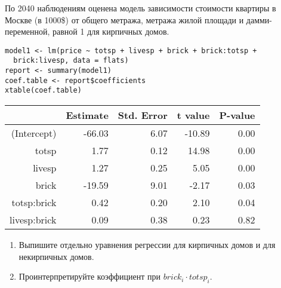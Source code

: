 \begin{problem}
По 2040 наблюдениям оценена модель зависимости стоимости квартиры в Москве (в 1000\$) от общего метража, метража жилой площади и дамми-переменной, равной 1 для кирпичных домов.
\begin{verbatim}
model1 <- lm(price ~ totsp + livesp + brick + brick:totsp +
  brick:livesp, data = flats)
report <- summary(model1)
coef.table <- report$coefficients
xtable(coef.table)
\end{verbatim}


\begin{tabular}{rrrrr}
  \hline
 & Estimate & Std. Error & t value & P-value \\
  \hline
(Intercept) & -66.03 & 6.07 & -10.89 & 0.00 \\
  totsp & 1.77 & 0.12 & 14.98 & 0.00 \\
  livesp & 1.27 & 0.25 & 5.05 & 0.00 \\
  brick & -19.59 & 9.01 & -2.17 & 0.03 \\
  totsp:brick & 0.42 & 0.20 & 2.10 & 0.04 \\
  livesp:brick & 0.09 & 0.38 & 0.23 & 0.82 \\
   \hline
\end{tabular}



\begin{enumerate}
\item Выпишите отдельно уравнения регрессии для кирпичных домов и для некирпичных домов.
\item Проинтерпретируйте коэффициент при $brick_i \cdot totsp_i$.
\end{enumerate}


\begin{sol}
\end{sol}
\end{problem}



